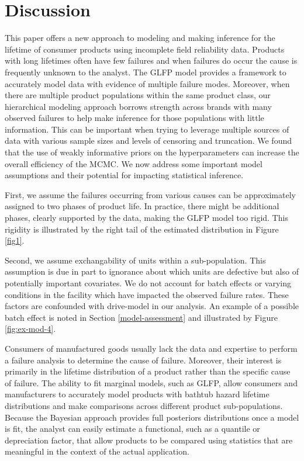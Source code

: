 \documentclass[12pt]{article}
\begin{document}
\section{Discussion}
\label{sec:Discussion}
This paper offers a new approach to modeling and making inference for the lifetime of consumer products using incomplete field reliability data.  Products with long lifetimes often have few failures and when failures do occur the cause is frequently unknown to the analyst.  The GLFP model provides a framework to accurately model data with evidence of multiple failure modes. Moreover, when there are multiple product populations within the same product class, our hierarchical modeling approach borrows strength across brands with many observed failures to help make inference for those populations with little information.  This can be important when trying to leverage multiple sources of data with various sample sizes and levels of censoring and truncation.  We found that the use of weakly informative priors on the hyperparameters can increase the overall efficiency of the MCMC.  We now address some important model assumptions and their potential for impacting statistical inference. 

First, we assume the failures occurring from various causes can be approximately assigned to two phases of product life.  In practice, there might be additional phases, clearly supported by the data, making the GLFP model too rigid. This rigidity is illustrated by the right tail of the estimated distribution in Figure \ref{fig1}.

Second, we assume exchangability of units within a sub-population. This assumption is due in part to ignorance about which units are defective but also of potentially important covariates. We do not account for batch effects or varying conditions in the facility which have impacted the observed failure rates. These factors are confounded with drive-model in our analysis. An example of a possible batch effect is noted in Section \ref{model-assessment} and illustrated by Figure \ref{fig:ex-mod-4}. 

Consumers of manufactured goods usually lack the data and expertise to perform a failure analysis to determine the cause of failure.  Moreover, their interest is primarily in the lifetime distribution of a product rather than the specific cause of failure.  The ability to fit marginal models, such as GLFP, allow consumers and manufacturers to accurately model products with bathtub hazard lifetime distributions and make comparisons across different product sub-populations.  Because the Bayesian approach provides full posteriors distributions once a model is fit, the analyst can easily estimate a functional, such as a quantile or depreciation factor, that allow products to be compared using statistics that are meaningful in the context of the actual application. 
\end{document}
